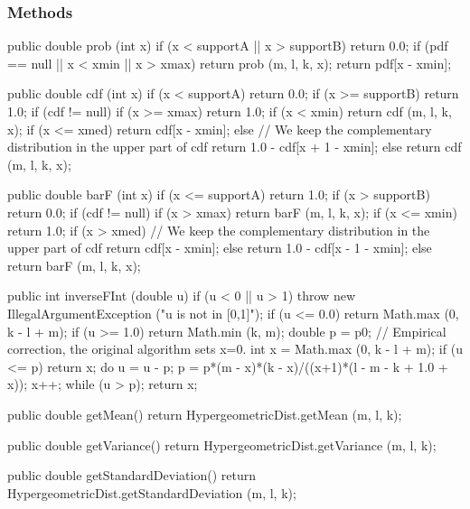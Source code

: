 \subsubsection* {Methods}
\begin{code}\begin{hide}

   public double prob (int x) {
      if (x < supportA || x > supportB)
         return 0.0;
      if (pdf == null || x < xmin || x > xmax)
         return prob (m, l, k, x);
      return pdf[x - xmin];
   }

   public double cdf (int x) {
      if (x < supportA)
         return 0.0;
      if (x >= supportB)
         return 1.0;
      if (cdf != null) {
         if (x >= xmax)
            return 1.0;
         if (x < xmin)
            return cdf (m, l, k, x);
         if (x <= xmed)
            return cdf[x - xmin];
         else
            // We keep the complementary distribution in the upper part of cdf
            return 1.0 - cdf[x + 1 - xmin];
      }
      else
         return cdf (m, l, k, x);
   }

   public double barF (int x) {
      if (x <= supportA)
         return 1.0;
      if (x > supportB)
         return 0.0;
      if (cdf != null) {
         if (x > xmax)
            return barF (m, l, k, x);
         if (x <= xmin)
            return 1.0;
         if (x > xmed)
           // We keep the complementary distribution in the upper part of cdf
           return cdf[x - xmin];
         else
            return 1.0 - cdf[x - 1 - xmin];
      }
      else
         return barF (m, l, k, x);
   }

   public int inverseFInt (double u) {
      if (u < 0 || u > 1)
         throw new IllegalArgumentException ("u is not in [0,1]");
      if (u <= 0.0)
         return Math.max (0, k - l + m);
      if (u >= 1.0)
         return Math.min (k, m);
      double p = p0;
     // Empirical correction, the original algorithm sets x=0.
     int x = Math.max (0, k - l + m);
     if (u <= p) return x;
     do {
        u = u - p;
        p = p*(m - x)*(k - x)/((x+1)*(l - m - k + 1.0 + x));
        x++;
     } while (u > p);
     return x;
   }

   public double getMean() {
      return HypergeometricDist.getMean (m, l, k);
   }

   public double getVariance() {
      return HypergeometricDist.getVariance (m, l, k);
   }

   public double getStandardDeviation() {
      return HypergeometricDist.getStandardDeviation (m, l, k);
   }\end{hide}


\end{code}
